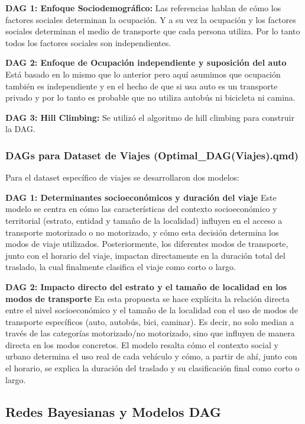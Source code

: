 \documentclass[12pt,a4paper]{article}
\begin{document}
\textbf{DAG 1: Enfoque Sociodemográfico:} Las referencias hablan de cómo los factores sociales determinan la ocupación. Y a su vez la ocupación y los factores sociales determinan el medio de transporte que cada persona utiliza. Por lo tanto todos los factores sociales son independientes.


\textbf{DAG 2: Enfoque de Ocupación independiente y suposición del auto}
Está basado en lo mismo que lo anterior pero aquí asumimos que ocupación también es independiente y en el hecho de que si usa auto es un transporte privado y por lo tanto es probable que no utiliza autobús ni bicicleta ni camina.

\textbf{DAG 3: Hill Climbing:}
Se utilizó el algoritmo de hill climbing para construir la DAG.

\subsubsection{DAGs para Dataset de Viajes (Optimal\_DAG(Viajes).qmd)}

Para el dataset específico de viajes se desarrollaron dos modelos:

\textbf{DAG 1: Determinantes socioeconómicos y duración del viaje}
Este modelo se centra en cómo las características del contexto socioeconómico y territorial (estrato, entidad y tamaño de la localidad) influyen en el acceso a transporte motorizado o no motorizado, y cómo esta decisión determina los modos de viaje utilizados. Posteriormente, los diferentes modos de transporte, junto con el horario del viaje, impactan directamente en la duración total del traslado, la cual finalmente clasifica el viaje como corto o largo.

\textbf{DAG 2: Impacto directo del estrato y el tamaño de localidad en los modos de transporte}
En esta propuesta se hace explícita la relación directa entre el nivel socioeconómico y el tamaño de la localidad con el uso de modos de transporte específicos (auto, autobús, bici, caminar). Es decir, no solo median a través de las categorías motorizado/no motorizado, sino que influyen de manera directa en los modos concretos. El modelo resalta cómo el contexto social y urbano determina el uso real de cada vehículo y cómo, a partir de ahí, junto con el horario, se explica la duración del traslado y su clasificación final como corto o largo.

\subsection{Redes Bayesianas y Modelos DAG}
\end{document}
